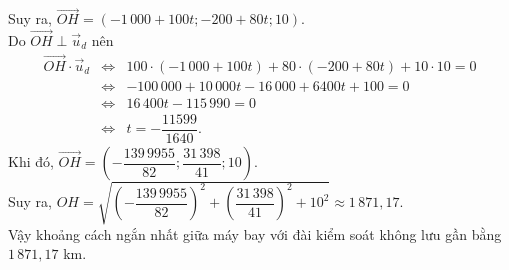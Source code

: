 \begin{ex}
{\begin{itemchoice}
			Suy ra, $\overrightarrow{OH}=(-1\,000+100t;-200+80t;10)$.\\
			Do $\overrightarrow{OH}\perp \overrightarrow{u}_d$ nên
			\allowdisplaybreaks
			\begin{eqnarray*}
				\overrightarrow{OH}\cdot \overrightarrow{u}_d&\Leftrightarrow& 100\cdot (-1\,000+100t)+80\cdot (-200+80t)+10\cdot 10=0\\
				&\Leftrightarrow& -100\,000+10\,000t-16\,000+6400t+100=0\\
				&\Leftrightarrow& 16\,400t-115\,990=0\\
				&\Leftrightarrow& t=-\dfrac{11599}{1640}.
			\end{eqnarray*}
			Khi đó, $\overrightarrow{OH}=\left(-\dfrac{139\,9955}{82};\dfrac{31\,398}{41};10\right)$.\\
			Suy ra, $OH=\sqrt{\left(-\dfrac{139\,9955}{82}\right)^2+\left(\dfrac{31\,398}{41}\right)^2+10^2}\approx 1\,871{,}17$.\\
			Vậy khoảng cách ngắn nhất giữa máy bay với đài kiểm soát không lưu gần bằng $1\,871{,}17$ km.
		\end{itemchoice}
	}
\end{ex}

